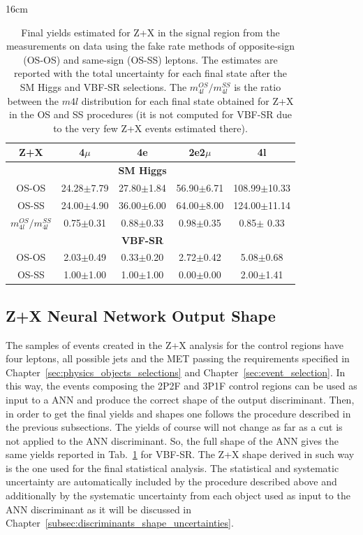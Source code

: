 \begin{table}[hbtp]{16cm}
	\centering
	\caption{Final yields estimated for Z+X in the signal region from the measurements on data using the fake rate methods of opposite-sign (OS-OS) and same-sign (OS-SS) leptons. The estimates are reported with the total uncertainty for each final state after the SM Higgs and VBF-SR selections. The $m_{4l}^{OS}/m_{4l}^{SS}$ is the ratio between the $m4l$ distribution for each final state obtained for Z+X in the OS and SS procedures (it is not computed for VBF-SR due to the very few Z+X events estimated there).}
	\begin{tabular}{c|c|c|c|c}
		\hline
		\rowcolor{light_gray}
		Z+X                       & 4$\mu$         & 4e                & 2e2$\mu$       & 4l\\
		\hline
		                          &                & \textbf{SM Higgs} &                &\\
		\hline
		OS-OS                     & 24.28$\pm$7.79 & 27.80$\pm$1.84    & 56.90$\pm$6.71 & 108.99$\pm$10.33\\
		OS-SS                     & 24.00$\pm$4.90 & 36.00$\pm$6.00    & 64.00$\pm$8.00 & 124.00$\pm$11.14\\
		$m_{4l}^{OS}/m_{4l}^{SS}$ &  0.75$\pm$0.31 &  0.88$\pm$0.33    &  0.98$\pm$0.35 &   0.85$\pm$ 0.33\\
		\hline
		                          &                & \textbf{VBF-SR}   &                &\\
		\hline
		OS-OS                     & 2.03$\pm$0.49  & 0.33$\pm$0.20     & 2.72$\pm$0.42  & 5.08$\pm$0.68\\
		OS-SS                     & 1.00$\pm$1.00  & 1.00$\pm$1.00     & 0.00$\pm$0.00  & 2.00$\pm$1.41\\
		\hline
	\end{tabular}
	\label{tab:final_zx_estimation}	
\end{table}


\subsection{Z+X Neural Network Output Shape}
The samples of events created in the Z+X analysis for the control regions have four leptons, all possible jets and the MET passing the requirements specified in Chapter~\ref{sec:physics_objects_selections} and Chapter~\ref{sec:event_selection}. In this way, the events composing the 2P2F and 3P1F control regions can be used as input to a ANN and produce the correct shape of the output discriminant. Then, in order to get the final yields and shapes one follows the procedure described in the previous subsections. The yields of course will not change as far as a cut is not applied to the ANN discriminant. So, the full shape of the ANN gives the same yields reported in Tab.~\ref{tab:final_zx_estimation} for VBF-SR. The Z+X shape derived in such way is the one used for the final statistical analysis. The statistical and systematic uncertainty are automatically included by the procedure described above and additionally by the systematic uncertainty from each object used as input to the ANN discriminant as it will be discussed in Chapter~\ref{subsec:discriminants_shape_uncertainties}.



